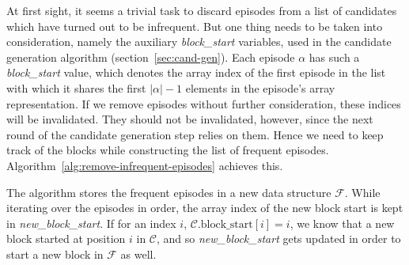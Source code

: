 At first sight, it seems a trivial task to discard episodes from a list of candidates which have turned out to be infrequent. But one thing needs to be taken into consideration, namely the auxiliary \emph{block\_start} variables, used in the candidate generation algorithm (section~\ref{sec:cand-gen}). Each episode $ \alpha $ has such a \emph{block\_start} value, which denotes the array index of the first episode in the list with which it shares the first $ | \alpha | - 1 $ elements in the episode's array representation. If we remove episodes without further consideration, these indices will be invalidated. They should not be invalidated, however, since the next round of the candidate generation step relies on them. Hence we need to keep track of the blocks while constructing the list of frequent episodes. Algorithm~\ref{alg:remove-infrequent-episodes} achieves this.

The algorithm stores the frequent episodes in a new data structure $ \mathcal{F} $. While iterating over the episodes in order, the array index of the new block start is kept in \emph{new\_block\_start}. If for an index $ i $, $ \mathcal{C}. \text{block\_start}[i] = i $, we know that a new block started at position $ i $ in $ \mathcal{C} $, and so \emph{new\_block\_start} gets updated in order to start a new block in $ \mathcal{F} $ as well.

